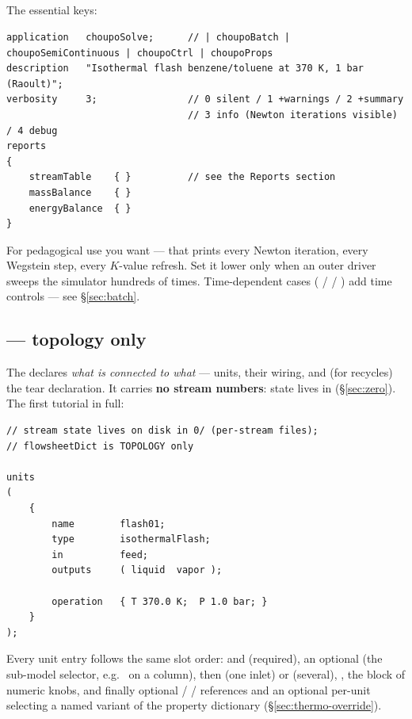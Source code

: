 \documentclass[11pt,a4paper]{article}
\begin{document}
\subsection{}

The essential keys:

\begin{lstlisting}[language=dict]
application   choupoSolve;      // | choupoBatch | choupoSemiContinuous | choupoCtrl | choupoProps
description   "Isothermal flash benzene/toluene at 370 K, 1 bar (Raoult)";
verbosity     3;                // 0 silent / 1 +warnings / 2 +summary
                                // 3 info (Newton iterations visible) / 4 debug
reports
{
    streamTable    { }          // see the Reports section
    massBalance    { }
    energyBalance  { }
}
\end{lstlisting}

For pedagogical use you want  --- that prints every
Newton iteration, every Wegstein step, every $K$-value refresh.  Set it
lower only when an outer driver sweeps the simulator hundreds of times.
Time-dependent cases ( /  / ) add time
controls --- see \S\ref{sec:batch}.

\subsection{ --- topology only}\label{sec:flowsheet}

The  declares \emph{what is connected to what} ---
units, their wiring, and (for recycles) the tear declaration.  It
carries \textbf{no stream numbers}: state lives in 
(\S\ref{sec:zero}).  The first tutorial in full:

\begin{lstlisting}[language=dict]
// stream state lives on disk in 0/ (per-stream files);
// flowsheetDict is TOPOLOGY only

units
(
    {
        name        flash01;
        type        isothermalFlash;
        in          feed;
        outputs     ( liquid  vapor );

        operation   { T 370.0 K;  P 1.0 bar; }
    }
);
\end{lstlisting}

Every unit entry follows the same slot order:  and
 (required), an optional  (the sub-model
selector, e.g.\  on a column), then  (one
inlet) or  (several), , the
 block of numeric knobs, and finally optional
 /  / 
references and an optional per-unit  selecting a named
variant of the property dictionary (\S\ref{sec:thermo-override}).
\end{document}

